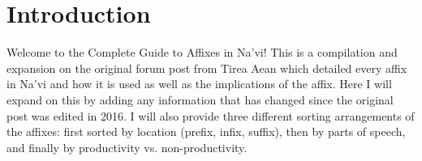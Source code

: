 \section{Introduction}\par

Welcome to the Complete Guide to Affixes in Na'vi!  This is a compilation and expansion on the original forum post from Tirea Aean which detailed every affix in Na'vi and how it is used as well as the implications of the affix.  Here I will expand on this by adding any information that has changed since the original post was edited in 2016.  I will also provide three different sorting arrangements of the affixes: first sorted by location (prefix, infix, suffix), then by parts of speech, and finally by productivity vs. non-productivity.\par